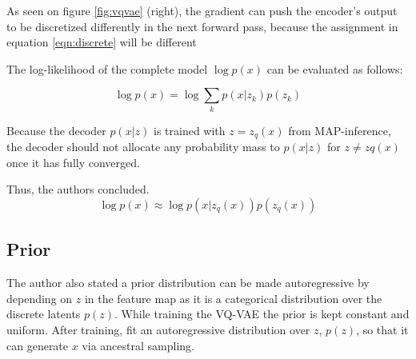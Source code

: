 As seen on figure \ref{fig:vqvae} (right), the gradient can push the encoder’s output to be discretized 
differently in the next forward pass, because the assignment in equation \ref{eqn:discrete} will be different

The log-likelihood of the complete model $\log p(x)$ can be evaluated as follows:

\begin{equation}
    \log p(x) = \log \sum _k p(x|z _k) p(z _k)
    \label{eqn:modellog}
\end{equation}

Because the decoder $p(x|z)$ is trained with $z = z _q(x)$ from MAP-inference, the decoder
should not allocate any probability mass to $p(x|z)$ for $z \neq zq(x)$ once it has fully converged.

Thus, the authors concluded.~\cite{razavi2019generating, oord2018neural}
\begin{equation}
    \log p(x) \approx \log p(x|z _q(x))p(z _q(x))
\end{equation}

\subsection{Prior}

The author also stated a prior distribution can be made autoregressive by depending on $z$ 
in the feature map as it is a categorical distribution over the discrete latents $p(z)$. 
While training the VQ-VAE the prior is kept constant and uniform. After training, fit 
an autoregressive distribution over $z$, $p(z)$, so that it can generate $x$ via ancestral sampling.
